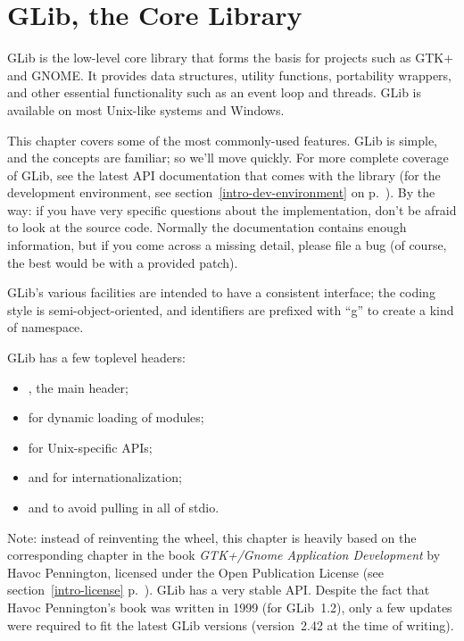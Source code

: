 \chapter{GLib, the Core Library}
\label{glib}

GLib is the low-level core library that forms the basis for projects such as GTK+ and GNOME. It provides data structures, utility functions, portability wrappers, and other essential functionality such as an event loop and threads. GLib is available on most Unix-like systems and Windows.

This chapter covers some of the most commonly-used features. GLib is simple, and the concepts are familiar; so we'll move quickly. For more complete coverage of GLib, see the latest API documentation that comes with the library (for the development environment, see section~\ref{intro-dev-environment} on p.~\pageref{intro-dev-environment}). By the way: if you have very specific questions about the implementation, don't be afraid to look at the source code. Normally the documentation contains enough information, but if you come across a missing detail, please file a bug (of course, the best would be with a provided patch).

GLib's various facilities are intended to have a consistent interface; the coding style is semi-object-oriented, and identifiers are prefixed with ``g'' to create a kind of namespace.

GLib has a few toplevel headers:
\begin{itemize}
  \item {}, the main header;
  \item {} for dynamic loading of modules;
  \item {} for Unix-specific APIs;
  \item {} and  for internationalization;
  \item {} and  to avoid pulling in all of stdio.
\end{itemize}

\bigskip
Note: instead of reinventing the wheel, this chapter is heavily based on the corresponding chapter in the book \emph{GTK+/Gnome Application Development} by Havoc Pennington, licensed under the Open Publication License (see section~\ref{intro-license} p.~\pageref{intro-license}). GLib has a very stable API. Despite the fact that Havoc Pennington's book was written in 1999 (for GLib~1.2), only a few updates were required to fit the latest GLib versions (version~2.42 at the time of writing).

